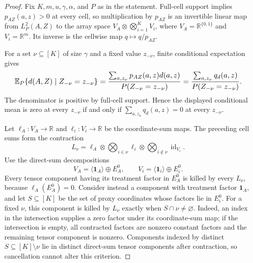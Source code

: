 \documentclass{article}
\begin{document}
\begin{proof}
Fix \(K,m,u,\gamma,\alpha\), and \(P\) as in the statement. Full-cell support implies \(p_{AZ}(a,z)>0\) at every cell, so multiplication by \(p_{AZ}\) is an invertible linear map from \(L_P^2(A,Z)\) to the array space \(V_A\otimes\bigotimes_{i=1}^K V_i\), where \(V_A=\mathbb R^{\{0,1\}}\) and \(V_i=\mathbb R^m\). Its inverse is the cellwise map \(q\mapsto q/p_{AZ}\).

For a set \(\nu\subseteq[K]\) of size \(\gamma\) and a fixed value \(z_{-\nu}\), finite conditional expectation gives
\[
\makebox[\linewidth][c]{\resizebox{0.98\linewidth}{!}{\par\noindent \makebox[\linewidth][c]{\resizebox{0.98\linewidth}{!}{\(\displaystyle \displaystyle \mathbb E_P\{d(A,Z)\mid Z_{-\nu}=z_{-\nu}\}=\frac{\sum_{a,z_\nu}p_{AZ}(a,z)d(a,z)}{P(Z_{-\nu}=z_{-\nu})}=\frac{\sum_{a,z_\nu}q_d(a,z)}{P(Z_{-\nu}=z_{-\nu})}.\)}}\par\noindent}}
\]
The denominator is positive by full-cell support. Hence the displayed conditional mean is zero at every \(z_{-\nu}\) if and only if \(\sum_{a,z_\nu}q_d(a,z)=0\) at every \(z_{-\nu}\).

Let \(\ell_A:V_A\to\mathbb R\) and \(\ell_i:V_i\to\mathbb R\) be the coordinate-sum maps. The preceding cell sums form the contraction
\[L_\nu=\ell_A\otimes\bigotimes_{i\in\nu}\ell_i\otimes\bigotimes_{i\notin\nu}\operatorname{id}_{V_i}.\]
Use the direct-sum decompositions
\[V_A=\langle\mathbf 1_A\rangle\oplus E_A^0,\qquad V_i=\langle\mathbf 1_i\rangle\oplus E_i^0.\]
Every tensor component having its treatment factor in \(E_A^0\) is killed by every \(L_\nu\), because \(\ell_A(E_A^0)=0\). Consider instead a component with treatment factor \(\mathbf 1_A\), and let \(S\subseteq[K]\) be the set of proxy coordinates whose factors lie in \(E_i^0\). For a fixed \(\nu\), this component is killed by \(L_\nu\) exactly when \(S\cap\nu\ne\varnothing\). Indeed, an index in the intersection supplies a zero factor under its coordinate-sum map; if the intersection is empty, all contracted factors are nonzero constant factors and the remaining tensor component is nonzero. Components indexed by distinct \(S\subseteq[K]\setminus\nu\) lie in distinct direct-sum tensor components after contraction, so cancellation cannot alter this criterion.


\end{proof}
\end{document}
